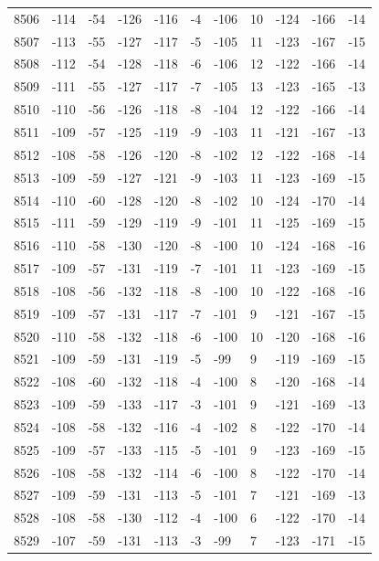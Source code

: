 \begin{table}[H]
\begin{tabular}{lllllllllll}
8506 & -114 & -54 & -126 & -116 & -4 & -106 & 10 & -124 & -166 & -14 \\
8507 & -113 & -55 & -127 & -117 & -5 & -105 & 11 & -123 & -167 & -15 \\
8508 & -112 & -54 & -128 & -118 & -6 & -106 & 12 & -122 & -166 & -14 \\
8509 & -111 & -55 & -127 & -117 & -7 & -105 & 13 & -123 & -165 & -13 \\
8510 & -110 & -56 & -126 & -118 & -8 & -104 & 12 & -122 & -166 & -14 \\
8511 & -109 & -57 & -125 & -119 & -9 & -103 & 11 & -121 & -167 & -13 \\
8512 & -108 & -58 & -126 & -120 & -8 & -102 & 12 & -122 & -168 & -14 \\
8513 & -109 & -59 & -127 & -121 & -9 & -103 & 11 & -123 & -169 & -15 \\
8514 & -110 & -60 & -128 & -120 & -8 & -102 & 10 & -124 & -170 & -14 \\
8515 & -111 & -59 & -129 & -119 & -9 & -101 & 11 & -125 & -169 & -15 \\
8516 & -110 & -58 & -130 & -120 & -8 & -100 & 10 & -124 & -168 & -16 \\
8517 & -109 & -57 & -131 & -119 & -7 & -101 & 11 & -123 & -169 & -15 \\
8518 & -108 & -56 & -132 & -118 & -8 & -100 & 10 & -122 & -168 & -16 \\
8519 & -109 & -57 & -131 & -117 & -7 & -101 & 9 & -121 & -167 & -15 \\
8520 & -110 & -58 & -132 & -118 & -6 & -100 & 10 & -120 & -168 & -16 \\
8521 & -109 & -59 & -131 & -119 & -5 & -99 & 9 & -119 & -169 & -15 \\
8522 & -108 & -60 & -132 & -118 & -4 & -100 & 8 & -120 & -168 & -14 \\
8523 & -109 & -59 & -133 & -117 & -3 & -101 & 9 & -121 & -169 & -13 \\
8524 & -108 & -58 & -132 & -116 & -4 & -102 & 8 & -122 & -170 & -14 \\
8525 & -109 & -57 & -133 & -115 & -5 & -101 & 9 & -123 & -169 & -15 \\
8526 & -108 & -58 & -132 & -114 & -6 & -100 & 8 & -122 & -170 & -14 \\
8527 & -109 & -59 & -131 & -113 & -5 & -101 & 7 & -121 & -169 & -13 \\
8528 & -108 & -58 & -130 & -112 & -4 & -100 & 6 & -122 & -170 & -14 \\
8529 & -107 & -59 & -131 & -113 & -3 & -99 & 7 & -123 & -171 & -15 \\

\end{tabular}
\end{table}
